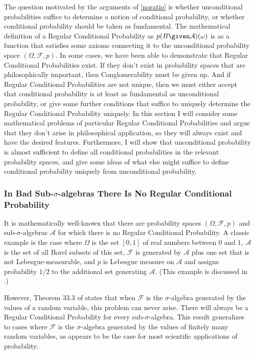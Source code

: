 The question motivated by the arguments of \autoref{noratio} is whether unconditional probabilities suffice to determine a notion of conditional probability, or whether conditional probability should be taken as fundamental. The mathematical definition of a Regular Conditional Probability as $p(B \given \mathcal{A})(\omega)$ is as a function that satisfies some axioms connecting it to the unconditional probability space $(\Omega,\mathcal{F},p)$. In some cases, we have been able to demonstrate that Regular Conditional Probabilities exist. If they don't exist in probability spaces that are philosophically important, then Conglomerability must be given up. And if Regular Conditional Probabilities are not unique, then we must either accept that conditional probability is at least as fundamental as unconditional probability, or give some further conditions that suffice to uniquely determine the Regular Conditional Probability uniquely. In this section I will consider some mathematical problems of particular Regular Conditional Probabilities and argue that they don't arise in philosophical application, so they will always exist and have the desired features. Furthermore, I will show that unconditional probability is almost sufficient to define all conditional probabilities in the relevant probability spaces, and give some ideas of what else might suffice to define conditional probability uniquely from unconditional probability.

\subsubsection{In Bad Sub-$\sigma$-algebras There Is No Regular Conditional Probability}\label{bad1}

It is mathematically well-known that there are probability spaces $(\Omega,\mathcal{F},p)$ and sub-$\sigma$-algebras $\mathcal{A}$ for which there is no Regular Conditional Probability. A classic example is the case where $\Omega$ is the set $[0,1]$ of real numbers between $0$ and $1$, $\mathcal{A}$ is the set of all Borel subsets of this set, $\mathcal{F}$ is generated by $\mathcal{A}$ plus one set that is not Lebesgue-measurable, and $p$ is Lebesgue measure on $\mathcal{A}$ and assigns probability $1/2$ to the additional set generating $\mathcal{A}$. (This example is discussed in \citealp[Exercise 33.11]{billingsley}.)

However, Theorem 33.3 of \citet{billingsley} states that when $\mathcal{F}$ is the $\sigma$-algebra generated by the values of a random variable, this problem can never arise. There will always be a Regular Conditional Probability for every sub-$\sigma$-algebra. This result generalizes to cases where $\mathcal{F}$ is the $\sigma$-algebra generated by the values of finitely many random variables, as appears to be the case for most scientific applications of probability.

